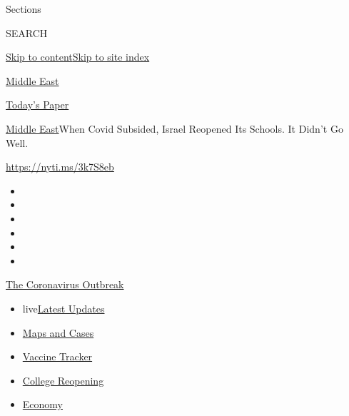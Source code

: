 Sections

SEARCH

\protect\hyperlink{site-content}{Skip to
content}\protect\hyperlink{site-index}{Skip to site index}

\href{https://www.nytimes.com/section/world/middleeast}{Middle East}

\href{https://myaccount.nytimes.com/auth/login?response_type=cookie\&client_id=vi}{}

\href{https://www.nytimes.com/section/todayspaper}{Today's Paper}

\href{/section/world/middleeast}{Middle East}\textbar{}When Covid
Subsided, Israel Reopened Its Schools. It Didn't Go Well.

\url{https://nyti.ms/3k7S8eb}

\begin{itemize}
\item
\item
\item
\item
\item
\item
\end{itemize}

\href{https://www.nytimes.com/news-event/coronavirus?action=click\&pgtype=Article\&state=default\&region=TOP_BANNER\&context=storylines_menu}{The
Coronavirus Outbreak}

\begin{itemize}
\tightlist
\item
  live\href{https://www.nytimes.com/2020/08/04/world/coronavirus-cases.html?action=click\&pgtype=Article\&state=default\&region=TOP_BANNER\&context=storylines_menu}{Latest
  Updates}
\item
  \href{https://www.nytimes.com/interactive/2020/us/coronavirus-us-cases.html?action=click\&pgtype=Article\&state=default\&region=TOP_BANNER\&context=storylines_menu}{Maps
  and Cases}
\item
  \href{https://www.nytimes.com/interactive/2020/science/coronavirus-vaccine-tracker.html?action=click\&pgtype=Article\&state=default\&region=TOP_BANNER\&context=storylines_menu}{Vaccine
  Tracker}
\item
  \href{https://www.nytimes.com/2020/08/02/us/covid-college-reopening.html?action=click\&pgtype=Article\&state=default\&region=TOP_BANNER\&context=storylines_menu}{College
  Reopening}
\item
  \href{https://www.nytimes.com/live/2020/08/04/business/stock-market-today-coronavirus?action=click\&pgtype=Article\&state=default\&region=TOP_BANNER\&context=storylines_menu}{Economy}
\end{itemize}

